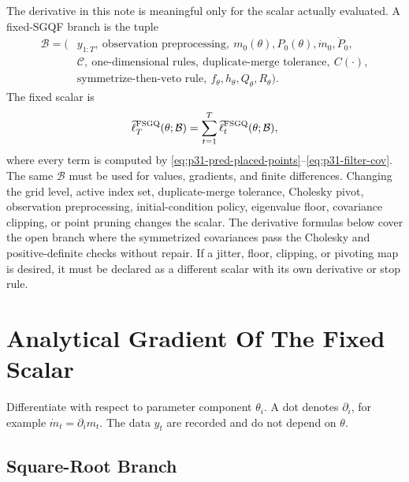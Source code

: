 \documentclass[11pt]{article}
\numberwithin{equation}{section}
\newcommand{\ellhat}{\widehat\ell}
\begin{document}
The derivative in this note is meaningful only for the scalar actually
evaluated.  A fixed-SGQF branch is the tuple
\begin{equation}
\begin{aligned}
  \mathcal B
  =
  (&y_{1:T},\ \text{observation preprocessing},\
  m_0(\theta),P_0(\theta),\dot m_0,\dot P_0,\\
  &\mathcal C,\ \text{one-dimensional rules},\
  \text{duplicate-merge tolerance},\
  C(\cdot),\\
  &\text{symmetrize-then-veto rule},\
  f_\theta,h_\theta,Q_\theta,R_\theta).
\end{aligned}
  \label{eq:p31-branch-tuple}
\end{equation}
The fixed scalar is
\begin{equation}
  \ellhat_T^{\rm FSGQ}(\theta;\mathcal B)
  =
  \sum_{t=1}^T \ellhat_t^{\rm FSGQ}(\theta;\mathcal B),
  \label{eq:p31-fixed-scalar}
\end{equation}
where every term is computed by
\eqref{eq:p31-pred-placed-points}--\eqref{eq:p31-filter-cov}.  The same
\(\mathcal B\) must be used for values, gradients, and finite differences.
Changing the grid level, active index set, duplicate-merge tolerance,
Cholesky pivot, observation preprocessing, initial-condition policy, eigenvalue
floor, covariance clipping, or point pruning changes the scalar.  The
derivative formulas below cover the open branch where the symmetrized
covariances pass the Cholesky and positive-definite checks without repair.  If
a jitter, floor, clipping, or pivoting map is desired, it must be declared as a
different scalar with its own derivative or stop rule.

\section{Analytical Gradient Of The Fixed Scalar}
\label{sec:p31-gradient}

Differentiate with respect to parameter component \(\theta_i\).  A dot denotes
\(\partial_i\), for example \(\dot m_t=\partial_i m_t\).  The data \(y_t\) are
recorded and do not depend on \(\theta\).

\subsection{Square-Root Branch}
\end{document}

